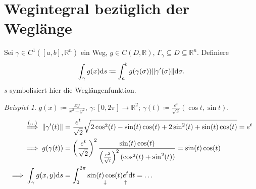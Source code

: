 \documentclass[a4paper]{article}
\theoremstyle{definition}
\theoremstyle{remark}
\newtheorem{beispiel}{Beispiel}
\renewcommand{\d}[1]{\mathrm{d}#1}
\begin{document}
	\section*{Wegintegral bezüglich der Weglänge}
		Sei $\gamma\in C^1([a, b], \mathbb{R}^n)$ ein Weg, $g\in C(D, \mathbb{R})$,
		$\Gamma_\gamma\subseteq D\subseteq\mathbb{R}^n$. Definiere
		\[
			\int_\gamma g(x)\d{s}\coloneqq\int_a^b g(\gamma(\sigma))\norm{\gamma'(\sigma)}\d{\sigma}.
		\]
		$s$ symbolisiert hier die Weglängenfunktion.
		\begin{beispiel}
			$g(x)\coloneqq\frac{xy}{x^2+y^2}$, $\gamma\colon[0, 2\pi]\to\mathbb{R}^2$;
			$\gamma(t)\coloneqq\frac{e^t}{\sqrt{2}}(\cos t, \sin t)$.
			\begin{align*}
				\stackrel{(\ldots)}{\implies}\norm{\gamma'(t)}&=\frac{e^t}{\sqrt{2}}
					\sqrt{2\cos^2(t)-\sin(t)\cos(t)+2\sin^2(t)+\sin(t)\cos(t)} = e^t\\
				\implies g(\gamma(t))&=\left(\frac{e^t}{\sqrt{2}}\right)^2
					\frac{\sin(t)\cos(t)}{\left(\frac{e^2}{\sqrt{t}}\right)^2(\cos^2(t)+\sin^2(t))}=\sin(t)\cos(t)\\
				\implies \int_\gamma g(x, y)\d{s}&=\int_0^{2\pi}\underset{\downarrow}{\sin(t)\cos(t)}\underset{\uparrow}{\vphantom{)}e^t}\d{t}
				= \ldots
			\end{align*}
		\end{beispiel}
\end{document}
